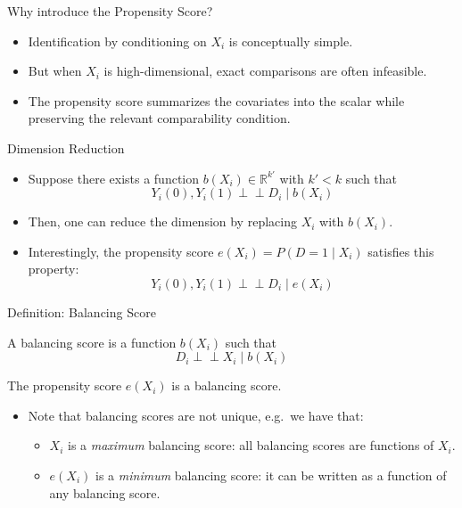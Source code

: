 \documentclass[11pt,aspectratio=169]{beamer}
\begin{document}
\begin{frame}{Why introduce the Propensity Score?}
\begin{itemize}
  \item Identification by conditioning on $X_i$ is conceptually simple.
  \item But when $X_i$ is high-dimensional, exact comparisons are often infeasible.
  \item The propensity score summarizes the covariates into the scalar while preserving the relevant comparability condition.
\end{itemize}
\end{frame}

\begin{frame}{Dimension Reduction}

\begin{itemize}
    \item Suppose there exists a function $b(X_i) \in \mathbb{R}^{k'}$ with $k' < k$ such that
    $$Y_i(0), Y_i(1) \perp\!\!\!\perp D_i \mid b(X_i) $$
    \item Then, one can reduce the dimension by replacing $X_i$ with $b(X_i)$.
    \item Interestingly, the propensity score $e(X_i) = P(D = 1 \mid X_i)$ satisfies this property:
    $$Y_i(0), Y_i(1) \perp\!\!\!\perp D_i \mid e(X_i) $$
\end{itemize}
\end{frame}
\begin{frame}{Definition: Balancing Score}
\begin{definitionbox}

A balancing score is a function $b(X_i)$ such that
$$D_i \perp\!\!\!\perp X_i \mid b(X_i) $$
\end{definitionbox}
\begin{theorembox}
The propensity score $e(X_i)$ is a balancing score.
\end{theorembox}
\begin{itemize}
    \item Note that balancing scores are not unique, e.g.\ we have that:
    \begin{itemize}
        \item[$ \blacksquare $] $X_i$ is a \textit{maximum} balancing score: all balancing scores are functions of $X_i$.
        \item[$ \blacksquare $] $e(X_i)$ is a \textit{minimum} balancing score: it can be written as a function of any balancing score.
    \end{itemize}
\end{itemize}
\end{frame}
\end{document}
